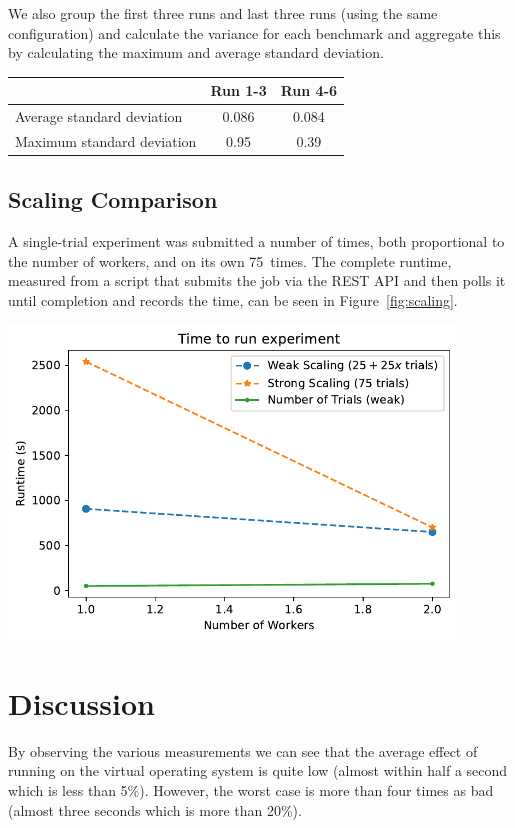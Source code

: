 \documentclass[a4paper]{IEEEtran}
\begin{document}
We also group the first three runs and last three runs (using the same configuration) and calculate the variance for each benchmark and aggregate this by calculating the maximum and average standard deviation.

\begin{Figure}
  \centering
  \begin{tabular}{|l|c|c|}
    \hline
    & Run 1-3 & Run 4-6 \\
  \hline
  Average standard deviation &  0.086 & 0.084 \\
  \hline
  Maximum standard deviation  & 0.95 & 0.39 \\
  \hline
\end{tabular}
\label{tbl:one}
\end{Figure}


\subsection{Scaling Comparison}

A single-trial experiment was submitted a number of times, both proportional to
the number of workers, and on its own 75~times. The complete runtime, measured
from a script that submits the job via the REST API and then polls it until
completion and records the time, can be seen in Figure~\ref{fig:scaling}.
\begin{Figure}
  \centering \includegraphics[width=0.9\textwidth]{scaling_graph}
  \label{fig:scaling}
\end{Figure}

\section{Discussion}
By observing the various measurements we can see that the average
effect of running on the virtual operating system is quite low (almost
within half a second which is less than 5\%). However, the worst case
is more than four times as bad (almost three seconds which is more
than 20\%).
\end{document}
